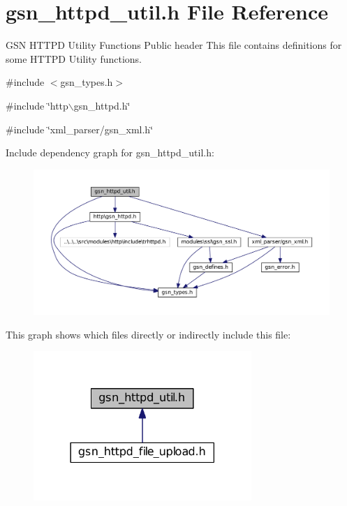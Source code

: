 \hypertarget{a00514}{
\section{gsn\_\-httpd\_\-util.h File Reference}
\label{a00514}
}


GSN HTTPD Utility Functions Public header This file contains definitions for some HTTPD Utility functions.  


{\ttfamily \#include $<$gsn\_\-types.h$>$}\par
{\ttfamily \#include \char`\"{}http$\backslash$gsn\_\-httpd.h\char`\"{}}\par
{\ttfamily \#include \char`\"{}xml\_\-parser/gsn\_\-xml.h\char`\"{}}\par
Include dependency graph for gsn\_\-httpd\_\-util.h:
\nopagebreak
\begin{figure}[H]
\begin{center}
\leavevmode
\includegraphics[width=400pt]{a00745}
\end{center}
\end{figure}
This graph shows which files directly or indirectly include this file:
\nopagebreak
\begin{figure}[H]
\begin{center}
\leavevmode
\includegraphics[width=234pt]{a00746}
\end{center}
\end{figure}
